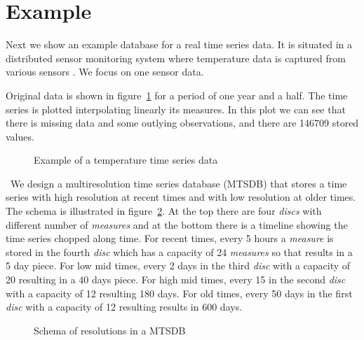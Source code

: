 \section{Example}
\label{sec:example}

Next we show an example database for a real time series data.  It is
situated in a distributed sensor monitoring system where temperature
data is captured from various sensors \cite{alippi10}. We focus on one
sensor data.

Original data is shown in figure~\ref{fig:exemple:original} for a
period of one year and a half. %
 The time series is plotted interpolating linearly its measures.
In this plot we can see that there is missing data and some outlying
observations, and there are 146709 stored values.


\begin{figure}[tp]
  \centering
  
  \caption{Example of a temperature time series data}
  \label{fig:exemple:original}
\end{figure}




\vspace{5pt}  \ We design a multiresolution
time series database (MTSDB) that stores a time series with high
resolution at recent times and with low resolution at older times. The
schema is illustrated in figure~\ref{fig:exemple:window}. At the top
there are four \emph{discs} with different number of \emph{measures}
and at the bottom there is a timeline showing the time series chopped
along time. For recent times, every 5 hours a \emph{measure} is stored
in the fourth \emph{disc} which has a capacity of 24 \emph{measures}
so that results in a 5 day piece. For low mid times, every 2 days in
the third \emph{disc} with a capacity of 20 resulting in a 40 days
piece. For high mid times, every 15 in the second \emph{disc} with a
capacity of 12 resulting 180 days. For old times, every 50 days in the
first \emph{disc} with a capacity of 12 resulting results in 600 days.

\begin{figure}[tp]
\centering
\setlength{\unitlength}{1.3mm}

\caption{Schema of resolutions in a MTSDB}
\label{fig:exemple:window}
\end{figure}



